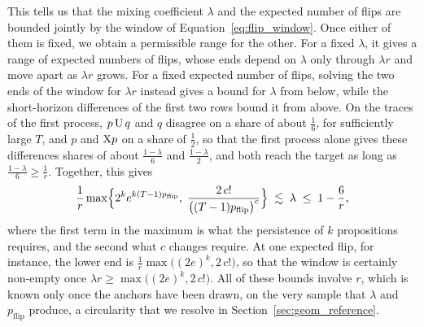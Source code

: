 \documentclass[titlepage,a4paper,11pt]{report}
\begin{document}
    This tells us that the mixing coefficient $\lambda$ and the expected number of flips are bounded jointly by the window of Equation~\eqref{eq:flip_window}. Once either of them is fixed, we obtain a permissible range for the other. For a fixed $\lambda$, it gives a range of expected numbers of flips, whose ends depend on $\lambda$ only through $\lambda r$ and move apart as $\lambda r$ grows. For a fixed expected number of flips, solving the two ends of the window for $\lambda r$ instead gives a bound for $\lambda$ from below, while the short-horizon differences of the first two rows bound it from above. On the traces of the first process, $p\,\text{U}\,q$ and $q$ disagree on a share of about $\frac16$, for sufficiently large $T$, and $p$ and $\text{X} p$ on a share of $\frac12$, so that the first process alone gives these differences shares of about $\frac{1-\lambda}{6}$ and $\frac{1-\lambda}{2}$, and both reach the target as long as $\frac{1-\lambda}{6}\ge\frac1r$. Together, this gives
    \begin{equation}\label{eq:lambda_bounds}
        \frac1r\max\Bigl\{2^k e^{k(T-1)p_{\text{flip}}},\;\frac{2\,c!}{\bigl((T-1)p_{\text{flip}}\bigr)^c}\Bigr\}\;\lesssim\;\lambda\;\le\;1-\frac6r ,
    \end{equation}
    where the first term in the maximum is what the persistence of $k$ propositions requires, and the second what $c$ changes require. At one expected flip, for instance, the lower end is $\frac1r\max\bigl((2e)^k,2\,c!\bigr)$, so that the window is certainly non-empty once $\lambda r\ge\max\bigl((2e)^k,2\,c!\bigr)$. All of these bounds involve $r$, which is known only once the anchors have been drawn, on the very sample that $\lambda$ and $p_{\text{flip}}$ produce, a circularity that we resolve in Section~\ref{sec:geom_reference}.
\end{document}
